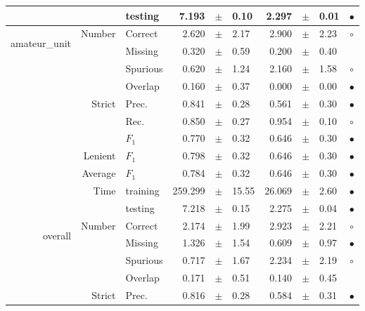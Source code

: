 \begin{longtable}{|r|r|l||rcl|rcl|c|}
\cline{3-10}
  &  &  testing  & 7.193 &  $\pm$  & 0.10 & 2.297 &  $\pm$  & 0.01 &  $\bullet$\\
\hline
\hline
\multirow{11}{*}{\begin{sideways}amateur\_unit\end{sideways} } & \multirow{4}{*}{Number} &  Correct  & 2.620 &  $\pm$  & 2.17 & 2.900 &  $\pm$  & 2.23 &  $\circ$\\
\cline{3-10}
  &  &  Missing  & 0.320 &  $\pm$  & 0.59 & 0.200 &  $\pm$  & 0.40 &   \\
\cline{3-10}
  &  &  Spurious  & 0.620 &  $\pm$  & 1.24 & 2.160 &  $\pm$  & 1.58 &  $\circ$\\
\cline{3-10}
  &  &  Overlap  & 0.160 &  $\pm$  & 0.37 & 0.000 &  $\pm$  & 0.00 &  $\bullet$\\
\cline{2-10}
  & \multirow{3}{*}{Strict} &  Prec.  & 0.841 &  $\pm$  & 0.28 & 0.561 &  $\pm$  & 0.30 &  $\bullet$\\
\cline{3-10}
  &  &  Rec.  & 0.850 &  $\pm$  & 0.27 & 0.954 &  $\pm$  & 0.10 &  $\circ$\\
\cline{3-10}
  &  &  $F_1$  & 0.770 &  $\pm$  & 0.32 & 0.646 &  $\pm$  & 0.30 &  $\bullet$\\
\cline{2-10}
  & Lenient &  $F_1$  & 0.798 &  $\pm$  & 0.32 & 0.646 &  $\pm$  & 0.30 &  $\bullet$\\
\cline{2-10}
  & Average &  $F_1$  & 0.784 &  $\pm$  & 0.32 & 0.646 &  $\pm$  & 0.30 &  $\bullet$\\
\cline{2-10}
  & \multirow{2}{*}{Time} &  training  & 259.299 &  $\pm$  & 15.55 & 26.069 &  $\pm$  & 2.60 &  $\bullet$\\
\cline{3-10}
  &  &  testing  & 7.218 &  $\pm$  & 0.15 & 2.275 &  $\pm$  & 0.04 &  $\bullet$\\
\hline
\hline
\multirow{11}{*}{\begin{sideways}overall\end{sideways} } & \multirow{4}{*}{Number} &  Correct  & 2.174 &  $\pm$  & 1.99 & 2.923 &  $\pm$  & 2.21 &  $\circ$\\
\cline{3-10}
  &  &  Missing  & 1.326 &  $\pm$  & 1.54 & 0.609 &  $\pm$  & 0.97 &  $\bullet$\\
\cline{3-10}
  &  &  Spurious  & 0.717 &  $\pm$  & 1.67 & 2.234 &  $\pm$  & 2.19 &  $\circ$\\
\cline{3-10}
  &  &  Overlap  & 0.171 &  $\pm$  & 0.51 & 0.140 &  $\pm$  & 0.45 &  \\
\cline{2-10}
  & \multirow{3}{*}{Strict} &  Prec.  & 0.816 &  $\pm$  & 0.28 & 0.584 &  $\pm$  & 0.31 &  $\bullet$\\

\end{longtable}
